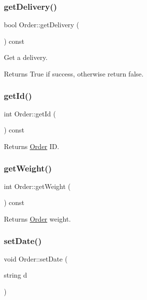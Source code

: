 \subsubsection{\texorpdfstring{get\+Delivery()}{getDelivery()}}
{\footnotesize\ttfamily bool Order\+::get\+Delivery (\begin{DoxyParamCaption}{ }\end{DoxyParamCaption}) const}



Get a delivery. 

\begin{DoxyReturn}{Returns}
True if success, otherwise return false. 
\end{DoxyReturn}
\mbox{\label{class_order_a9506e43ee697e335b3e0e3ad04f4d8fa}} 
\subsubsection{\texorpdfstring{get\+Id()}{getId()}}
{\footnotesize\ttfamily int Order\+::get\+Id (\begin{DoxyParamCaption}{ }\end{DoxyParamCaption}) const}

\begin{DoxyReturn}{Returns}
\hyperlink{class_order}{Order} ID. 
\end{DoxyReturn}
\mbox{\label{class_order_ac0631c875d8dbfbf296cdeadbef15280}} 
\subsubsection{\texorpdfstring{get\+Weight()}{getWeight()}}
{\footnotesize\ttfamily int Order\+::get\+Weight (\begin{DoxyParamCaption}{ }\end{DoxyParamCaption}) const}

\begin{DoxyReturn}{Returns}
\hyperlink{class_order}{Order} weight. 
\end{DoxyReturn}
\mbox{\label{class_order_af48cd8aa6f874ba9960d07a4764440b7}} 
\subsubsection{\texorpdfstring{set\+Date()}{setDate()}}
{\footnotesize\ttfamily void Order\+::set\+Date (\begin{DoxyParamCaption}\item[{string}]{d }\end{DoxyParamCaption})}


